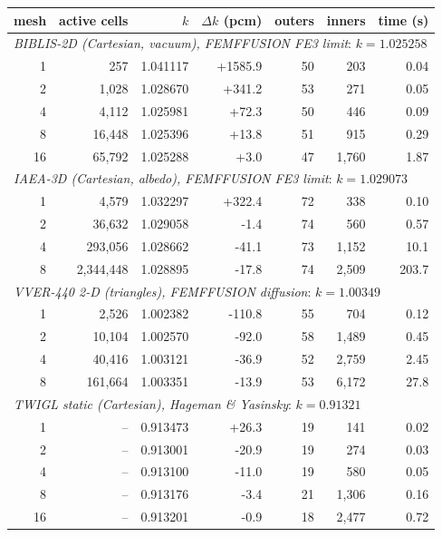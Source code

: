 \begin{tabular}{rrrrrrr}
\hline
mesh & active cells & $k$ & $\Delta k$ (pcm) & outers & inners & time (s)\\
\hline
\multicolumn{7}{l}{\textit{BIBLIS-2D (Cartesian, vacuum), FEMFFUSION FE3 limit}: $k = 1.025258$}\\
1 & 257 & 1.041117 & +1585.9 & 50 & 203 & 0.04\\
2 & 1,028 & 1.028670 & +341.2 & 53 & 271 & 0.05\\
4 & 4,112 & 1.025981 & +72.3 & 50 & 446 & 0.09\\
8 & 16,448 & 1.025396 & +13.8 & 51 & 915 & 0.29\\
16 & 65,792 & 1.025288 & +3.0 & 47 & 1,760 & 1.87\\
\multicolumn{7}{l}{\textit{IAEA-3D (Cartesian, albedo), FEMFFUSION FE3 limit}: $k = 1.029073$}\\
1 & 4,579 & 1.032297 & +322.4 & 72 & 338 & 0.10\\
2 & 36,632 & 1.029058 & -1.4 & 74 & 560 & 0.57\\
4 & 293,056 & 1.028662 & -41.1 & 73 & 1,152 & 10.1\\
8 & 2,344,448 & 1.028895 & -17.8 & 74 & 2,509 & 203.7\\
\multicolumn{7}{l}{\textit{VVER-440 2-D (triangles), FEMFFUSION diffusion}: $k = 1.00349$}\\
1 & 2,526 & 1.002382 & -110.8 & 55 & 704 & 0.12\\
2 & 10,104 & 1.002570 & -92.0 & 58 & 1,489 & 0.45\\
4 & 40,416 & 1.003121 & -36.9 & 52 & 2,759 & 2.45\\
8 & 161,664 & 1.003351 & -13.9 & 53 & 6,172 & 27.8\\
\multicolumn{7}{l}{\textit{TWIGL static (Cartesian), Hageman \& Yasinsky}: $k = 0.91321$}\\
1 & -- & 0.913473 & +26.3 & 19 & 141 & 0.02\\
2 & -- & 0.913001 & -20.9 & 19 & 274 & 0.03\\
4 & -- & 0.913100 & -11.0 & 19 & 580 & 0.05\\
8 & -- & 0.913176 & -3.4 & 21 & 1,306 & 0.16\\
16 & -- & 0.913201 & -0.9 & 18 & 2,477 & 0.72\\
\hline
\end{tabular}
